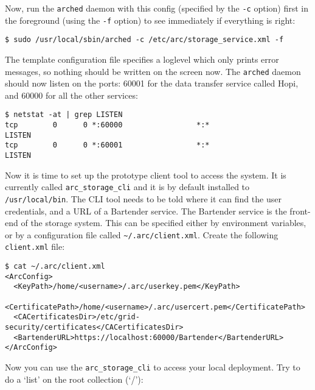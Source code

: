 \documentclass{article}
\begin{document}
Now, run the \verb!arched! daemon with this config (specified by the \verb!-c! option) first in the foreground (using the \verb!-f! option) to see immediately if everything is right:

\begin{verbatim}
$ sudo /usr/local/sbin/arched -c /etc/arc/storage_service.xml -f
\end{verbatim}

The template configuration file specifies a loglevel which only prints error messages, so nothing should be written on the screen now.
The \verb!arched! daemon should now listen on the ports: 60001 for the data transfer service called Hopi, and 60000 for all the other services:

\begin{verbatim}
$ netstat -at | grep LISTEN
tcp        0      0 *:60000                 *:*                     LISTEN     
tcp        0      0 *:60001                 *:*                     LISTEN     
\end{verbatim}

Now it is time to set up the prototype client tool to access the system. It is currently called \verb!arc_storage_cli! and it is by default installed to \verb!/usr/local/bin!. The CLI tool needs to be told where it can find the user credentials, and a URL of a Bartender service. The Bartender service is the front-end of the storage system. This can be specified either by environment variables, or by a configuration file called \verb!~/.arc/client.xml!. Create the following \verb!client.xml! file:

\begin{verbatim}
$ cat ~/.arc/client.xml 
<ArcConfig>
  <KeyPath>/home/<username>/.arc/userkey.pem</KeyPath>
  <CertificatePath>/home/<username>/.arc/usercert.pem</CertificatePath>
  <CACertificatesDir>/etc/grid-security/certificates</CACertificatesDir>
  <BartenderURL>https://localhost:60000/Bartender</BartenderURL>
</ArcConfig>
\end{verbatim}

Now you can use the \verb!arc_storage_cli! to access your local deployment. Try to do a `list' on the root collection (`/'):
\end{document}
